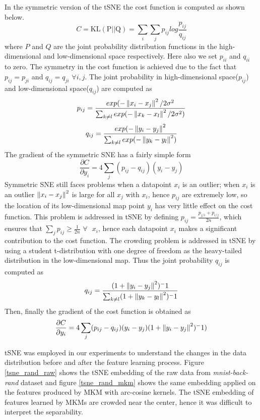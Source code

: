 In the symmetric version of the  tSNE the cost function is computed as shown below.
\begin{equation*}
C = \textrm{KL}(\textrm{P} \big|\big| \textrm{Q}) = \sum_{i}\sum_{j} p_{ij} log \frac{p_{ij}}{q_{ij}}
\end{equation*}
where $P$ and $Q$ are the joint probability distribution functions in the high-dimensional and low-dimensional space respectively. Here also we set $p_{ii}$ and $q_{ii}$ to zero. The symmetry in the cost function is achieved due to the fact that $p_{ij} = p_{ji}$ and $q_{ij} = q_{ji}$ $\forall i,j$. The joint probability in high-dimensional space($p_{ij}$) and low-dimensional space($q_{ij}$) are computed as
\[ p_{ij} = \frac{exp(-\left\lVert x_i-x_j\right\rVert^2/2 \sigma^2}{\sum_{k\neq l} exp(-\left\lVert x_k - x_l\right\rVert^2/2 \sigma^2)}  \]
\[ q_{ij} = \frac{exp(-\left\lVert y_i-y_j\right\rVert^2}{\sum_{k\neq l} exp(-\left\lVert y_k - y_l\right\rVert^2)}  \]
The gradient of the symmetric SNE has a fairly simple form
\[ \frac{\partial C}{\partial y_i} = 4\sum_j(p_{ij}-q_{ij})(y_i - y_j) \]
Symmetric SNE still faces problems when a datapoint $x_i$ is an outlier; when $x_i$ is an outlier $\left\lVert x_i-x_j\right\rVert^2$ is large for all $x_j$ with $x_i$, hence $p_{ij}$ are extremely low, so the location of its low-dimensional map point $y_i$ has very little effect on the cost function. This problem is addressed in tSNE by defining $p_{ij} = \frac{p_{j/i} + p_{i/j}}{2n}$, which ensures that $\sum_j p_{ij} \ge \frac{1}{2n}$ $\forall \textrm{ } x_i$, hence each datapoint $x_i$ makes a significant contribution to the cost function. The crowding problem is addressed in tSNE by using a student t-distribution with one degree of freedom as the heavy-tailed distribution in the low-dimensional map. Thus the joint probability $q_{ij}$ is computed as
\[ q_{ij} = \frac{(1+\left\lVert y_i-y_j\right\rVert^2)^-1}{\sum_{k \neq l} (1+\left\lVert y_k-y_l\right\rVert^2)^-1} \] 
Then, finally the gradient of the cost function is obtained as
\[ \frac{\partial C}{\partial y_i} = 4\sum_j(p_{ij}-q_{ij})(y_i - y_j)(1+\left\lVert y_i-y_j\right\rVert^2)^-1) \]

tSNE was employed in our experiments to understand the changes in the data distribution before and after the feature learning process. Figure \ref{tsne_rand_raw} shows the tSNE embedding of the raw data from \textit{mnist-back-rand} dataset and figure \ref{tsne_rand_mkm} shows the same embedding applied on the features produced by MKM with arc-cosine kernels. The tSNE embedding of features learned by MKMs are crowded near the center, hence it was difficult to interpret the separability.

